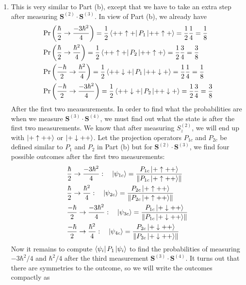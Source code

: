 \documentclass{article}
\theoremstyle{definition}
\newcommand{\f}[2]{\frac{#1}{#2}}
\newcommand{\lp}{\left(}
\newcommand{\rp}{\right)}
\begin{document}
\begin{enumerate}[label=(\alph*)]
	\item This is very similar to Part (b), except that we have to take an extra step after measuring $\mathbf{S}^{(2)}\cdot \mathbf{S}^{(3)}$. In view of Part (b), we already have
	\begin{align*}
	&\Pr\lp \f{\hbar}{2} \to \f{-3\hbar^2}{4} \rp = \f{1}{2} \bra{++\uparrow +} P_1 \ket{++\uparrow +} = \f{1}{2}\f{1}{4} = \f{1}{8} \\
	&\Pr\lp \f{\hbar}{2} \to \f{\hbar^2}{4} \rp =  \f{1}{2} \bra{++\uparrow +} P_2 \ket{++\uparrow +} = \f{1}{2}\f{3}{4} = \f{3}{8}\\
	&\Pr\lp \f{-\hbar}{2} \to \f{\hbar^2}{4} \rp =  \f{1}{2} \bra{++\downarrow +} P_1 \ket{++\downarrow +} = \f{1}{2}\f{1}{4} = \f{1}{8}\\
	&\Pr\lp \f{-\hbar}{2} \to \f{-3\hbar^2}{4} \rp =  \f{1}{2} \bra{++\downarrow +} P_2 \ket{++\downarrow +} = \f{1}{2}\f{3}{4} = \f{3}{8}
	\end{align*}
	After the first two meausurements. In order to find what the probabilities are when we measure $\mathbf{S}^{(3)}\cdot \mathbf{S}^{(4)}$, we must find out what the state is after the first two measurements. We know that after measuring $S_z^{(2)}$, we will end up with $\ket{+\uparrow ++}$ or $\ket{+ \downarrow ++}$. Let the projection operators $P_{1c}$ and $P_{2c}$ be defined similar to $P_1$ and $P_2$ in Part (b) but for $\mathbf{S}^{(2)} \cdot \mathbf{S}^{(3)}$, we find four possible outcomes after the first two measurements:
	\begin{align*}
	&\f{\hbar}{2} \to \f{-3\hbar^2}{4}: \quad\ket{\psi_{1c}} = \f{P_{1c} \ket{+\uparrow ++}}{\norm{P_{1c} \ket{+\uparrow ++}}}\\
	&\f{\hbar}{2} \to \f{\hbar^2}{4}: \quad\ket{\psi_{2c}} = \f{P_{2c} \ket{+\uparrow ++}}{\norm{P_{2c} \ket{+\uparrow ++}}}\\
	&\f{-\hbar}{2} \to \f{-3\hbar^2}{4}: \quad\ket{\psi_{3c}} = \f{P_{1c} \ket{+\downarrow ++}}{\norm{P_{1c} \ket{+\downarrow ++}}}\\
	&\f{-\hbar}{2} \to \f{\hbar^2}{4}: \quad\ket{\psi_{4c}} = \f{P_{2c} \ket{+\downarrow ++}}{\norm{P_{2c} \ket{+\downarrow ++}}}
	\end{align*}
	Now it remains to compute $\bra{\psi_i} P_1 \ket{\psi_i}$ to find the probabilities of measuring $-3\hbar^2/4$ and $\hbar^2/4$ after the third measurement $\mathbf{S}^{(3)}\cdot \mathbf{S}^{(4)}$. It turns out that there are symmetries to the outcome, so we will write the outcomes compactly as 
	\begin{align*}

\end{align*}
\end{enumerate}
\end{document}
